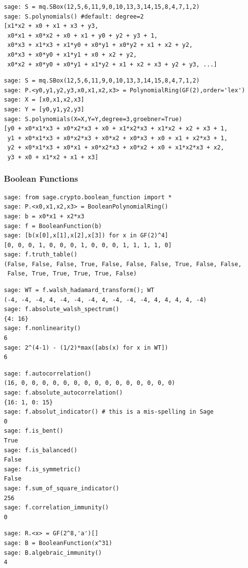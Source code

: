 \documentclass[10pt]{beamer}
\begin{document}
\begin{frame}
\framebreak

\begin{lstlisting}
sage: S = mq.SBox(12,5,6,11,9,0,10,13,3,14,15,8,4,7,1,2)
sage: S.polynomials() #default: degree=2
[x1*x2 + x0 + x1 + x3 + y3,
 x0*x1 + x0*x2 + x0 + x1 + y0 + y2 + y3 + 1,
 x0*x3 + x1*x3 + x1*y0 + x0*y1 + x0*y2 + x1 + x2 + y2,
 x0*x3 + x0*y0 + x1*y1 + x0 + x2 + y2,
 x0*x2 + x0*y0 + x0*y1 + x1*y2 + x1 + x2 + x3 + y2 + y3, ...]
\end{lstlisting}

\begin{lstlisting}
sage: S = mq.SBox(12,5,6,11,9,0,10,13,3,14,15,8,4,7,1,2)
sage: P.<y0,y1,y2,y3,x0,x1,x2,x3> = PolynomialRing(GF(2),order='lex')
sage: X = [x0,x1,x2,x3]
sage: Y = [y0,y1,y2,y3]
sage: S.polynomials(X=X,Y=Y,degree=3,groebner=True)
[y0 + x0*x1*x3 + x0*x2*x3 + x0 + x1*x2*x3 + x1*x2 + x2 + x3 + 1,
 y1 + x0*x1*x3 + x0*x2*x3 + x0*x2 + x0*x3 + x0 + x1 + x2*x3 + 1,
 y2 + x0*x1*x3 + x0*x1 + x0*x2*x3 + x0*x2 + x0 + x1*x2*x3 + x2,
 y3 + x0 + x1*x2 + x1 + x3]
\end{lstlisting}
\end{frame}

\begin{frame}
\frametitle{Boolean Functions}

\begin{lstlisting}
sage: from sage.crypto.boolean_function import *
sage: P.<x0,x1,x2,x3> = BooleanPolynomialRing()
sage: b = x0*x1 + x2*x3
sage: f = BooleanFunction(b)
sage: [b(x[0],x[1],x[2],x[3]) for x in GF(2)^4]
[0, 0, 0, 1, 0, 0, 0, 1, 0, 0, 0, 1, 1, 1, 1, 0]
sage: f.truth_table()
(False, False, False, True, False, False, False, True, False, False,
 False, True, True, True, True, False)
\end{lstlisting}

\framebreak

\begin{lstlisting}
sage: WT = f.walsh_hadamard_transform(); WT
(-4, -4, -4, 4, -4, -4, -4, 4, -4, -4, -4, 4, 4, 4, 4, -4)
sage: f.absolute_walsh_spectrum()
{4: 16}
sage: f.nonlinearity()
6
sage: 2^(4-1) - (1/2)*max([abs(x) for x in WT])
6
\end{lstlisting}

\framebreak

\begin{lstlisting}
sage: f.autocorrelation()
(16, 0, 0, 0, 0, 0, 0, 0, 0, 0, 0, 0, 0, 0, 0, 0)
sage: f.absolute_autocorrelation()
{16: 1, 0: 15}
sage: f.absolut_indicator() # this is a mis-spelling in Sage
0
sage: f.is_bent()
True
sage: f.is_balanced()
False
sage: f.is_symmetric()
False
sage: f.sum_of_square_indicator()
256
sage: f.correlation_immunity()
0
\end{lstlisting}

\begin{lstlisting}
sage: R.<x> = GF(2^8,'a')[]
sage: B = BooleanFunction(x^31)
sage: B.algebraic_immunity()
4
\end{lstlisting}
\end{frame}
\end{document}
